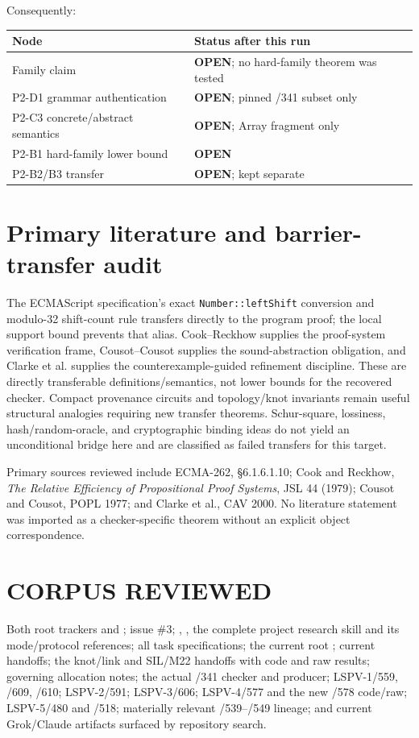 \documentclass[11pt]{article}
\newcommand{\OPEN}{\textbf{OPEN}}
\begin{document}
Consequently:
\begin{center}
\begin{tabular}{ll}
\toprule
Node & Status after this run\\
\midrule
Family claim & \OPEN; no hard-family theorem was tested\\
P2-D1 grammar authentication & \OPEN; pinned /341 subset only\\
P2-C3 concrete/abstract semantics & \OPEN; Array fragment only\\
P2-B1 hard-family lower bound & \OPEN\\
P2-B2/B3 transfer & \OPEN; kept separate\\
\bottomrule
\end{tabular}
\end{center}

\section*{Primary literature and barrier-transfer audit}
The ECMAScript specification's exact \texttt{Number::leftShift} conversion and
modulo-32 shift-count rule transfers directly to the program proof; the local
support bound prevents that alias.  Cook--Reckhow supplies the proof-system
verification frame, Cousot--Cousot supplies the sound-abstraction obligation,
and Clarke et al. supplies the counterexample-guided refinement discipline.
These are directly transferable definitions/semantics, not lower bounds for
the recovered checker.  Compact provenance circuits and topology/knot
invariants remain useful structural analogies requiring new transfer theorems.
Schur-square, lossiness, hash/random-oracle, and cryptographic binding ideas do
not yield an unconditional bridge here and are classified as failed transfers
for this target.

Primary sources reviewed include ECMA-262, \S6.1.6.1.10; Cook and Reckhow,
\emph{The Relative Efficiency of Propositional Proof Systems}, JSL 44 (1979);
Cousot and Cousot, POPL 1977; and Clarke et al., CAV 2000.  No literature
statement was imported as a checker-specific theorem without an explicit
object correspondence.

\section*{CORPUS REVIEWED}
Both root trackers  and ; issue \#3;
, , the complete project research skill and its
mode/protocol references; all task specifications; the current root
; current handoffs; the knot/link and SIL/M22 handoffs with code
and raw results; governing allocation notes; the actual /341 checker and
producer; LSPV-1/559, /609, /610; LSPV-2/591; LSPV-3/606; LSPV-4/577 and the
new /578 code/raw; LSPV-5/480 and /518; materially relevant /539--/549 lineage;
and current Grok/Claude artifacts surfaced by repository search.
\end{document}
